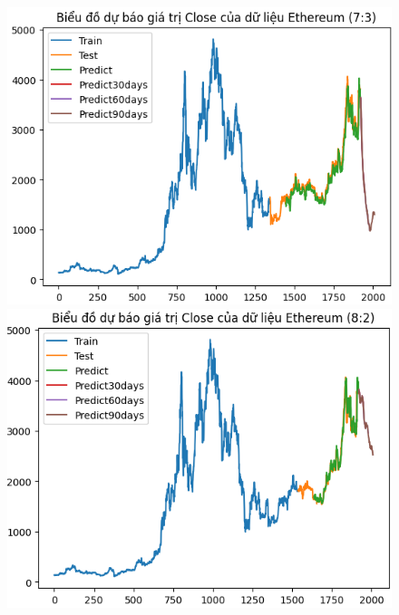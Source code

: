 \documentclass[conference]{IEEEtran}
\begin{document}
	\begin{figure}[H]
		\centering
		\begin{minipage}{0.15\textwidth}
			\centering
			\includegraphics[width=1\textwidth]{Figure/ETH73.png}
		\end{minipage}
		\hfill
		\begin{minipage}{0.15\textwidth}
			\centering
			\includegraphics[width=1\textwidth]{Figure/ETH82.png}
		\end{minipage}
		\hfill
		\begin{minipage}{0.15\textwidth}
			\centering

\end{minipage}
\end{figure}
\end{document}
